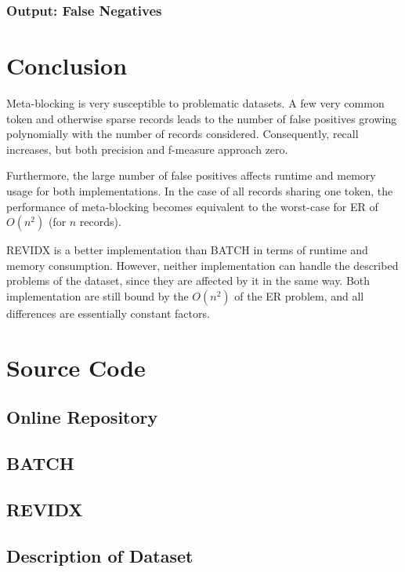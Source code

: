 \documentclass[a4paper,12pt]{article}
\begin{document}

\subsubsection{Output: False Negatives}


\section{Conclusion}
Meta-blocking is very susceptible to problematic datasets. A few very common token and otherwise sparse records leads to the number of false positives growing polynomially with the number of records considered. Consequently, recall increases, but both precision and f-measure approach zero.

Furthermore, the large number of false positives affects runtime and memory usage for both implementations. In the case of all records sharing one token, the performance of meta-blocking becomes equivalent to the worst-case for ER of $O(n^{2})$ (for $n$ records).

REVIDX is a better implementation than BATCH in terms of runtime and memory consumption. However, neither implementation can handle the described problems of the dataset, since they are affected by it in the same way. Both implementation are still bound by the $O(n^{2})$ of the ER problem, and all differences are essentially constant factors.




\appendix
\section{Source Code}
\subsection{Online Repository}

\newpage
\subsection{BATCH}


\newpage
\subsection{REVIDX}


\newpage
\subsection{Description of Dataset}

\end{document}
